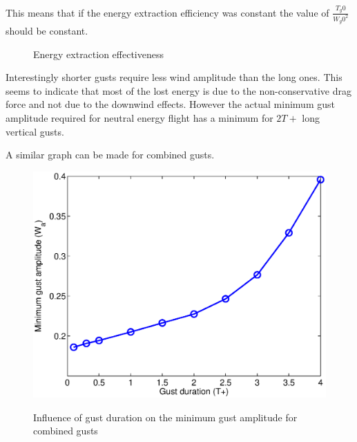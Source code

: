 \par This means that if the energy extraction efficiency was constant the value of $\frac{T_g0}{{W_g0}^2}$ should be constant.

\begin{figure}[h!]
  \centering
  \caption{Energy extraction effectiveness}
\end{figure}



\FloatBarrier

\par Interestingly shorter gusts require less wind amplitude than the long ones.
This seems to indicate that most of the lost energy is due to the non-conservative drag force and not due to the downwind effects.
However the actual minimum gust amplitude required for neutral energy flight has a minimum for $2T+$ long vertical gusts.

\par A similar graph can be made for combined gusts.

\begin{figure}[h!]
  \begin{center}
    \scalebox{0.8}
    {\includegraphics{./Figures/combined_gust_amplitude_vs_duration.eps}}
  \end{center}
  \caption{Influence of gust duration on the minimum gust amplitude for combined gusts}
  \label{fig:combined_amplitude_duration}
\end{figure}


\FloatBarrier

